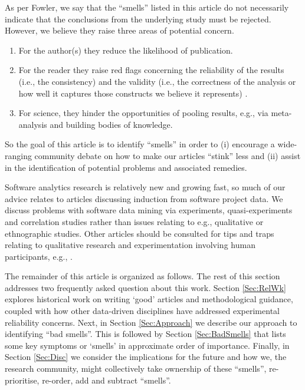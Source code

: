 \documentclass[preprint,10pt]{elsarticle}
\newcommand{\RED}{\color{red}}
\newcommand{\BLACK}{\color{black}}
\begin{document}
As per Fowler, we say that the ``smells''  listed in this article do not necessarily indicate that the conclusions from the underlying study must be rejected.  However, we believe they raise three areas of potential concern.
\begin{enumerate}
    \item For the author(s) they reduce the likelihood of publication.
    \item For the reader they raise red flags concerning the reliability of the results \RED (i.e., the consistency) and the validity (i.e., the correctness of the analysis or how well it captures those constructs we believe it represents) \BLACK.
    \item For science, they hinder the opportunities of pooling results, e.g., via meta-analysis and building bodies of knowledge. 
\end{enumerate}
So the goal of this article is to identify ``smells'' in order to (i) encourage a wide-ranging community debate on how to make our articles ``stink'' less and (ii) assist in the identification of potential problems and associated remedies.  

Software analytics research is relatively new and growing fast, so much of our advice relates to articles discussing induction from software project data. We discuss problems with software data mining via experiments, quasi-experiments and correlation studies \cite{Shad02} rather than issues relating to e.g., qualitative or ethnographic studies.  Other articles should be consulted for tips and traps relating to qualitative research and experimentation involving human participants, e.g., \cite{stol2016grounded,cruzes2011research,ko2015practical,petersen2015guidelines}.

The remainder of this article is organized as follows. The rest of this section addresses two frequently asked question about this work. Section \ref{Sec:RelWk} explores historical work on writing `good' articles and methodological guidance, coupled with how other data-driven disciplines have addressed experimental reliability concerns.  Next, in Section \ref{Sec:Approach} we describe our approach to identifying ``bad smells''.  This is followed by Section \ref{Sec:BadSmells} that lists some key symptoms or `smells' in approximate order of importance.  Finally, in Section \ref{Sec:Disc} we consider the implications for the future and how we, the research community, might collectively take ownership of these ``smells'', re-prioritise, re-order, add and subtract ``smells''.
\end{document}
